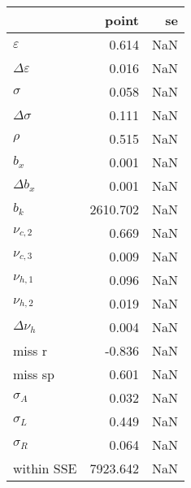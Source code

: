\begin{tabular}{lrr}
\toprule
{} &     point &  se \\
\midrule
$\varepsilon$       &     0.614 & NaN \\
$\Delta\varepsilon$ &     0.016 & NaN \\
$\sigma$            &     0.058 & NaN \\
$\Delta\sigma$      &     0.111 & NaN \\
$\rho$              &     0.515 & NaN \\
$b_x$               &     0.001 & NaN \\
$\Delta b_x$        &     0.001 & NaN \\
$b_k$               &  2610.702 & NaN \\
$\nu_{c,2}$         &     0.669 & NaN \\
$\nu_{c,3}$         &     0.009 & NaN \\
$\nu_{h,1}$         &     0.096 & NaN \\
$\nu_{h,2}$         &     0.019 & NaN \\
$\Delta \nu_{h}$    &     0.004 & NaN \\
miss r              &    -0.836 & NaN \\
miss sp             &     0.601 & NaN \\
$\sigma_{A}$        &     0.032 & NaN \\
$\sigma_{L}$        &     0.449 & NaN \\
$\sigma_{R}$        &     0.064 & NaN \\
within SSE          &  7923.642 & NaN \\
\bottomrule
\end{tabular}
